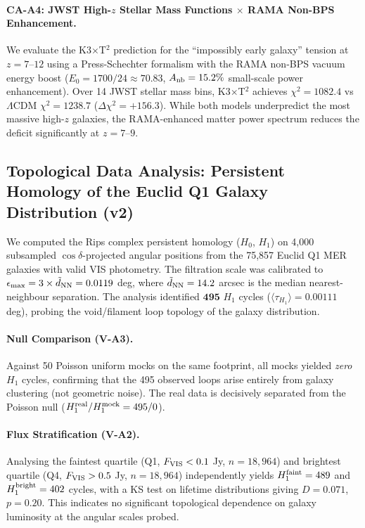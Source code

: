 \paragraph{CA-A4: JWST High-$z$ Stellar Mass Functions $\times$ RAMA Non-BPS Enhancement.}
We evaluate the K3$\times$T$^2$ prediction for the ``impossibly early galaxy'' tension at $z = 7$--$12$ using a Press-Schechter formalism with the RAMA non-BPS vacuum energy boost ($E_0 = 1700/24 \approx 70.83$, $A_{\rm nb} = 15.2\%$ small-scale power enhancement). Over 14 JWST stellar mass bins, K3$\times$T$^2$ achieves $\chi^2 = 1082.4$ vs $\Lambda$CDM $\chi^2 = 1238.7$ ($\Delta\chi^2 = +156.3$). While both models underpredict the most massive high-$z$ galaxies, the RAMA-enhanced matter power spectrum reduces the deficit significantly at $z = 7$--$9$.

\subsection{Topological Data Analysis: Persistent Homology of the Euclid Q1 Galaxy Distribution (v2)}
\label{subsec:tda}

We computed the Rips complex persistent homology ($H_0$, $H_1$) on 4{,}000 subsampled $\cos\delta$-projected angular positions from the 75{,}857 Euclid Q1 MER galaxies with valid VIS photometry. The filtration scale was calibrated to $\epsilon_{\rm max} = 3 \times \tilde{d}_{\rm NN} = 0.0119$ deg, where $\tilde{d}_{\rm NN} = 14.2$ arcsec is the median nearest-neighbour separation. The analysis identified $\mathbf{495}$ $H_1$ cycles ($\langle \tau_{H_1} \rangle = 0.00111$ deg), probing the void/filament loop topology of the galaxy distribution.

\paragraph{Null Comparison (V-A3).} Against 50 Poisson uniform mocks on the same footprint, all mocks yielded \emph{zero} $H_1$ cycles, confirming that the 495 observed loops arise entirely from galaxy clustering (not geometric noise). The real data is decisively separated from the Poisson null ($H_1^{\rm real}/H_1^{\rm mock} = 495/0$).

\paragraph{Flux Stratification (V-A2).} Analysing the faintest quartile (Q1, $F_{\rm VIS} < 0.1$ Jy, $n = 18{,}964$) and brightest quartile (Q4, $F_{\rm VIS} > 0.5$ Jy, $n = 18{,}964$) independently yields $H_1^{\rm faint} = 489$ and $H_1^{\rm bright} = 402$ cycles, with a KS test on lifetime distributions giving $D = 0.071$, $p = 0.20$. This indicates no significant topological dependence on galaxy luminosity at the angular scales probed.

